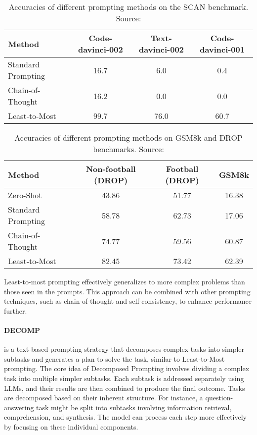 \begin{table}[h!]
	\centering
	\begin{tabularx}{\textwidth}{Xccc}
		\hline
		\textbf{Method}    & \textbf{Code-davinci-002} & \textbf{Text-davinci-002} & \textbf{Code-davinci-001} \\
		\hline
		Standard Prompting & 16.7                      & 6.0                       & 0.4                       \\
		Chain-of-Thought   & 16.2                      & 0.0                       & 0.0                       \\
		Least-to-Most      & 99.7                      & 76.0                      & 60.7                      \\
		\hline
	\end{tabularx}
	\caption{Accuracies of different prompting methods on the SCAN benchmark. Source: \textcite{zhou2022least}}
	\label{tab:compositional}
\end{table}
\begin{table}[h!]
	\centering
	\begin{tabularx}{\textwidth}{Xccc}
		\hline
		\textbf{Method}    & \textbf{Non-football (DROP)} & \textbf{Football (DROP)} & \textbf{GSM8k} \\
		\hline
		Zero-Shot          & 43.86                        & 51.77                    & 16.38          \\
		Standard Prompting & 58.78                        & 62.73                    & 17.06          \\
		Chain-of-Thought   & 74.77                        & 59.56                    & 60.87          \\
		Least-to-Most      & 82.45                        & 73.42                    & 62.39          \\
		\hline
	\end{tabularx}
	\caption{Accuracies of different prompting methods on GSM8k and DROP benchmarks. Source: \textcite{zhou2022least}}
	\label{tab:math}
\end{table}

Least-to-most prompting effectively generalizes to more complex problems than those seen in the prompts.
This approach can be combined with other prompting techniques, such as chain-of-thought and self-consistency, to enhance performance further.


\paragraph{DECOMP}
\label{par:decomp}
is a text-based prompting strategy that decomposes complex tasks into simpler subtasks and generates a plan to solve the task, similar to Least-to-Most prompting.
The core idea of Decomposed Prompting involves dividing a complex task into multiple simpler subtasks.
Each subtask is addressed separately using LLMs, and their results are then combined to produce the final outcome.
Tasks are decomposed based on their inherent structure.
For instance, a question-answering task might be split into subtasks involving information retrieval, comprehension, and synthesis.
The model can process each step more effectively by focusing on these individual components.

